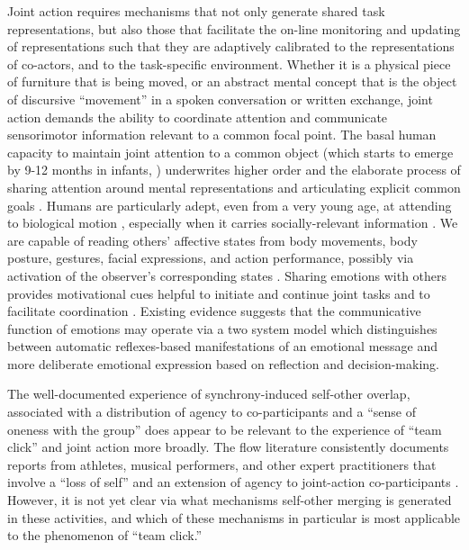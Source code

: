 Joint action requires mechanisms that not only generate shared task representations, but also those that facilitate the on-line monitoring and updating of representations such that they are adaptively calibrated to the representations of co-actors, and to the task-specific environment.  Whether it is a physical piece of furniture that is being moved, or an abstract mental concept that is the object of discursive ``movement'' in a spoken conversation or written exchange, joint action demands the ability to coordinate attention and communicate sensorimotor information relevant to a common focal point.  The basal human capacity to maintain joint attention to a common object (which starts to emerge by 9-12 months in infants, \cite[see]{Carpenter2013}) underwrites higher order and the elaborate process of sharing attention around mental representations and articulating explicit common goals \citep{Tomasello2014}.
Humans are particularly adept, even from a very young age, at attending to biological motion \citep{Scholl2000}, especially when it carries socially-relevant information \citep{Kozlowski1977,Cutting1977,Dittrich1996}.
We are capable of reading others' affective states from body movements, body posture, gestures, facial expressions, and action performance, possibly via activation of the observer's corresponding states \citep{Bastiaansen2009,Borgomaneri2012}. Sharing emotions with others provides motivational cues helpful to initiate and continue joint tasks and to facilitate coordination \citep{Michael2016}. Existing evidence suggests that the communicative function of emotions may operate via a two system model which distinguishes between automatic reflexes-based manifestations of an emotional message and more deliberate emotional expression based on reflection and decision-making\citep{DeGelder2006}.

The well-documented experience of synchrony-induced self-other overlap, associated with a distribution of agency to co-participants and a ``sense of oneness with the group'' \citep{Swann2012} does appear to be relevant to the experience of ``team click'' and joint action more broadly.  The flow literature consistently documents reports from athletes, musical performers, and other expert practitioners that involve a ``loss of self'' and an extension of agency to joint-action co-participants \citep{Jackson1995,Jackson1999}.  However, it is not yet clear via what mechanisms self-other merging is generated in these activities, and which of these mechanisms in particular is most applicable to the phenomenon of ``team click.''

